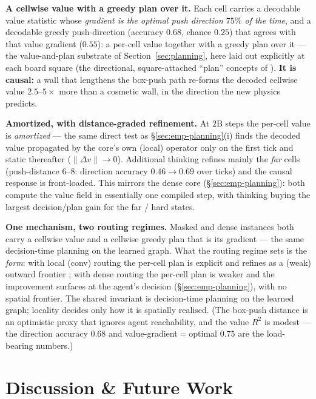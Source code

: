 \documentclass{article} %
\theoremstyle{plain}
\theoremstyle{definition}
\begin{document}
\textbf{A cellwise value with a greedy plan over it.} Each cell carries a decodable value statistic whose
\emph{gradient is the optimal push direction $75\%$ of the time}, and a decodable greedy push-direction
(accuracy $0.68$, chance $0.25$) that agrees with that value gradient ($0.55$): a per-cell value together
with a greedy plan over it --- the value-and-plan substrate of Section~\ref{sec:planning}, here laid out
explicitly at each board square (the directional, square-attached ``plan'' concepts of
\citet{bush2025interpreting}). \textbf{It is causal:} a wall that lengthens the box-push
path re-forms the decoded cellwise value $2.5$--$5\times$ more than a cosmetic wall, in the direction the new
physics predicts.

\textbf{Amortized, with distance-graded refinement.} At $2\mathrm{B}$ steps the per-cell value is
\emph{amortized} --- the same direct test as \S\ref{sec:emp-planning}(i) finds the decoded value propagated by
the core's own (local) operator only on the first tick and static thereafter ($\lVert\Delta v\rVert\!\to\!0$).
Additional thinking refines mainly the \emph{far} cells (push-distance $6$--$8$: direction accuracy
$0.46\!\to\!0.69$ over ticks) and the causal response is front-loaded. This mirrors the dense core
(\S\ref{sec:emp-planning}): both compute the value field in essentially one compiled step, with thinking
buying the largest decision/plan gain for the far / hard states.

\textbf{One mechanism, two routing regimes.} Masked and dense instances both carry a cellwise value and a
cellwise greedy plan that is its gradient --- the same decision-time planning on the learned graph. What the
routing regime sets is the \emph{form}: with local (conv) routing the per-cell plan is explicit and refines as
a (weak) outward frontier \citep{bush2025interpreting,taufeeque2024planning}; with dense routing the per-cell
plan is weaker and the improvement surfaces at the agent's decision (\S\ref{sec:emp-planning}), with no
spatial frontier. The shared invariant is decision-time planning on the learned graph; locality decides only
how it is spatially realised. (The box-push distance is an optimistic
proxy that ignores agent reachability, and the value $R^2$ is modest --- the direction accuracy $0.68$ and
value-gradient${=}$optimal $0.75$ are the load-bearing numbers.)

\section{Discussion \& Future Work}
\label{sec:discussion}
\end{document}
